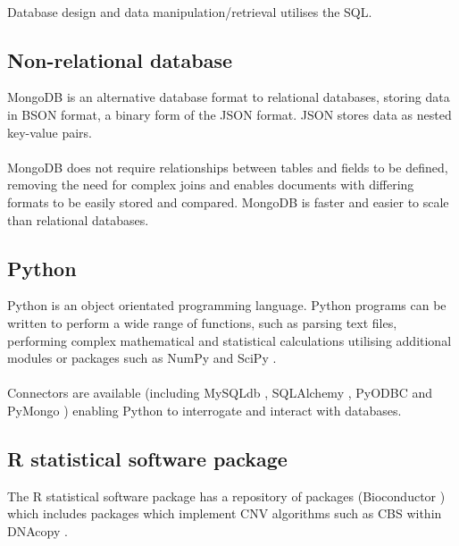 \paragraph*{}
Database design and data manipulation/retrieval utilises the \ac{SQL}. 

\subsection{Non-relational database}
MongoDB \cite{mongodb_inc._mongodb_????} is an alternative database format to relational databases, storing data in BSON format, a binary form of the JSON format. JSON stores data as nested key-value pairs. 
\paragraph*{}
MongoDB does not require relationships between tables and fields to be defined, removing the need for complex joins and enables documents with differing formats to be easily stored and compared. MongoDB is faster and easier to scale than relational databases.

\subsection{Python}
Python is an object orientated programming language. Python programs can be written to perform a wide range of functions, such as parsing text files, performing complex mathematical and statistical calculations utilising additional modules or packages such as NumPy \cite{vanderwalt2011} and SciPy \cite{scipy_scipyorg_????}.
\paragraph*{}
Connectors are available (including MySQLdb \cite{dustman2014}, SQLAlchemy \cite{bayer_sqlalchemy_????}, PyODBC \cite{pyodbc_mkleehammer/pyodbc_????} and PyMongo \cite{pymongo_python_????}) enabling Python to interrogate and interact with databases.

\subsection{R statistical software package}
The R statistical software package \cite{rfoundationforstatisticalcomputing2014} has a repository of packages (Bioconductor \cite{huber_orchestrating_2015}) which includes packages which implement CNV algorithms such as \ac{CBS} within DNAcopy \cite{Sechan2015}.  